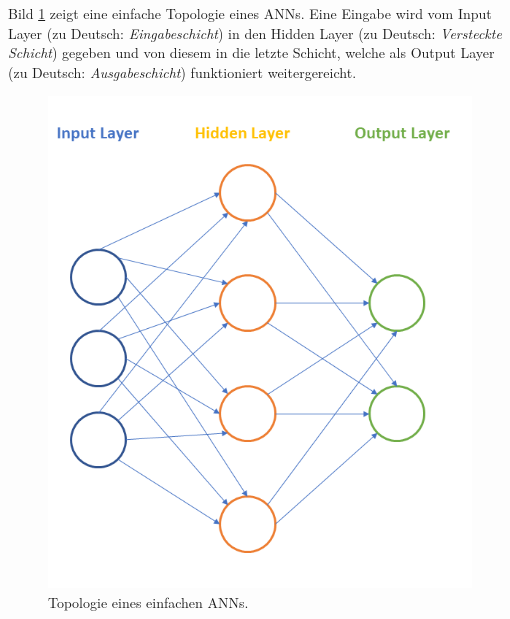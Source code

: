 


Bild \ref{fig:basictop} zeigt eine einfache Topologie eines ANNs. Eine Eingabe wird vom Input Layer (zu Deutsch: \textit{Eingabeschicht}) in den Hidden Layer (zu Deutsch: \textit{Versteckte Schicht}) gegeben und von diesem in die letzte Schicht, welche als Output Layer (zu Deutsch: \textit{Ausgabeschicht}) funktioniert weitergereicht. 

\begin{figure}[ht]
\centering
\includegraphics[scale=0.5]{pictures/grafiken/Folie3}
\caption[Caption for LOF]{Topologie eines einfachen ANNs.} 
\label{fig:basictop}
\end{figure}

